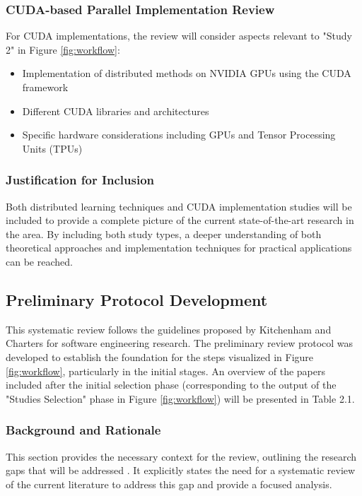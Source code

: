 \subsubsection{CUDA-based Parallel Implementation Review}
For CUDA implementations, the review will consider aspects relevant to "Study 2" in Figure
\ref{fig:workflow}:
\begin{itemize}
	\item Implementation of distributed methods on NVIDIA GPUs using the CUDA framework
	\item Different CUDA libraries and architectures
	\item Specific hardware considerations including GPUs and Tensor Processing Units (TPUs)
\end{itemize}

\subsubsection{Justification for Inclusion}
Both distributed learning techniques and CUDA implementation studies will be included to provide a
complete picture of the current state-of-the-art research in the area. By including both study
types, a deeper understanding of both theoretical approaches and implementation techniques for
practical applications can be reached.

\subsection{Preliminary Protocol Development}
This systematic review follows the guidelines proposed by Kitchenham and Charters for software
engineering research. The preliminary review protocol was developed to establish the foundation for
the steps visualized in Figure \ref{fig:workflow}, particularly in the initial stages. An overview
of the papers included after the initial selection phase (corresponding to the output of the
"Studies Selection" phase in Figure \ref{fig:workflow}) will be presented in Table 2.1.

\subsubsection{Background and Rationale}
This section provides the necessary context for the review, outlining the research gaps that will
be addressed \cite{ben-nun_demystifying_2020}. It explicitly states the need for a systematic
review of the current literature to address this gap and provide a focused analysis.

